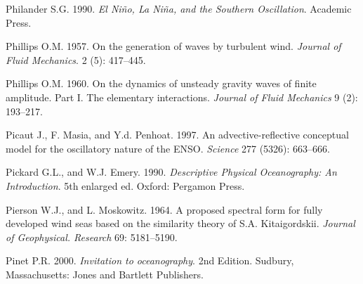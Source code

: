 \begin{thebibliography}{999}
Philander S.G.  1990. \textit{El Ni\~{n}o, La Ni\~{n}a, and the
  Southern Oscillation}. Academic Press.
%

Phillips O.M.  1957. On the generation of waves by turbulent wind.
\textit{Journal of Fluid Mechanics}. 2 (5): 417--445.
%

Phillips O.M.  1960. On the dynamics of unsteady gravity waves of
finite amplitude.  Part I.  The elementary
interactions. \textit{Journal of Fluid Mechanics} 9 (2): 193--217.
%

Picaut J., F. Masia, and Y.d. Penhoat.  1997. An advective-reflective
conceptual model for the oscillatory nature of the
ENSO. \textit{Science} 277 (5326): 663--666.
%

Pickard G.L., and W.J. Emery.  1990. \textit{Descriptive Physical
  Oceanography: An Introduction}. 5th enlarged ed. Oxford: Pergamon
Press.
%

Pierson W.J., and L. Moskowitz.  1964. A proposed spectral form for
fully developed wind seas based on the similarity theory of
S.A. Kitaigordskii.  \textit{Journal of Geophysical. Research} 69:
5181--5190.
%

Pinet P.R.  2000. \textit{Invitation to oceanography}. 2nd Edition.
Sudbury, Massachusetts: Jones and Bartlett Publishers.
%


\end{thebibliography}
